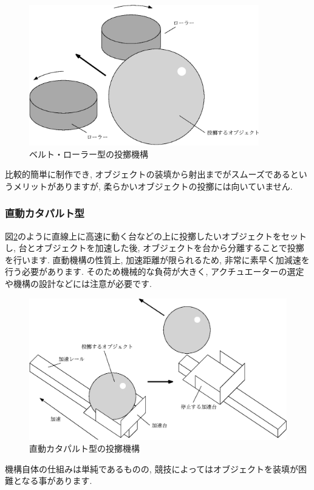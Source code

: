 \begin{figure}[h]
  \centering
  \includegraphics[width=10cm]{mecha/fig/roller.eps}
  \caption{ベルト・ローラー型の投擲機構}
  \label{fig:roller}
\end{figure}

比較的簡単に制作でき, オブジェクトの装填から射出までがスムーズであるというメリットがありますが, 柔らかいオブジェクトの投擲には向いていません. 
\subsubsection{直動カタパルト型}
図\ref{fig:cataput}のように直線上に高速に動く台などの上に投擲したいオブジェクトをセットし, 台とオブジェクトを加速した後, オブジェクトを台から分離することで投擲を行います. 
直動機構の性質上, 加速距離が限られるため, 非常に素早く加減速を行う必要があります. 
そのため機械的な負荷が大きく, アクチュエーターの選定や機構の設計などには注意が必要です. 

\begin{figure}[h]
  \centering
  \includegraphics[width=15cm]{mecha/fig/catapult.eps}
  \caption{直動カタパルト型の投擲機構}
  \label{fig:cataput}
\end{figure}

機構自体の仕組みは単純であるものの, 競技によってはオブジェクトを装填が困難となる事があります. 
